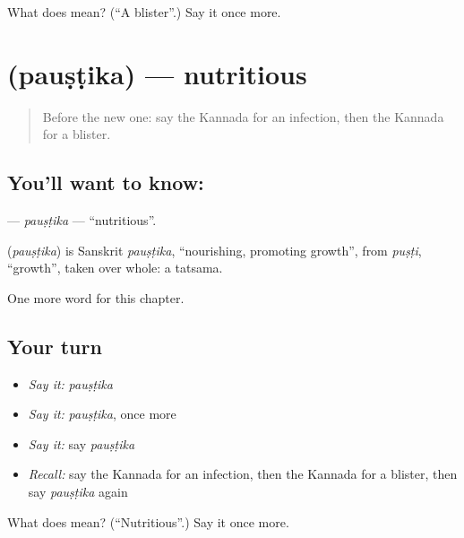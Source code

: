 \begin{tcolorbox}[breakable,colback=teal!4,colframe=teal!35!black,title={Before you move on}]
What does  mean? (\textquotedblleft{}A blister\textquotedblright{}.) Say it once more.
\end{tcolorbox}
\section[\texorpdfstring{\kn{ಪೌಷ್ಟಿಕ} (pauṣṭika)}{ಪೌಷ್ಟಿಕ (pauṣṭika)}]{ (pauṣṭika) — nutritious}

\label{lesson:KA-C170-paustika}



\begin{quote}
Before the new one: say the Kannada for an infection, then the Kannada for a blister.
\end{quote}

\subsection*{You'll want to know: }
\textbf{} — \emph{pauṣṭika} — \textquotedblleft{}nutritious\textquotedblright{}.

\begin{cousinweb}
\textbf{} (\emph{pauṣṭika}) is Sanskrit \emph{pauṣṭika}, \textquotedblleft{}nourishing, promoting growth\textquotedblright{}, from \emph{puṣṭi}, \textquotedblleft{}growth\textquotedblright{}, taken over whole: a tatsama.
\end{cousinweb}

\begin{grammarlens}[title={What you've built}]
One more word for this chapter.
\end{grammarlens}

\subsection*{Your turn}
\begin{itemize}
\raggedright
  \item \emph{Say it:} \emph{pauṣṭika}
  \item \emph{Say it:} \emph{pauṣṭika}, once more
  \item \emph{Say it:} say \emph{pauṣṭika}
  \item \emph{Recall:} say the Kannada for an infection, then the Kannada for a blister, then say \emph{pauṣṭika} again
\end{itemize}

\begin{tcolorbox}[breakable,colback=teal!4,colframe=teal!35!black,title={Before you move on}]
What does  mean? (\textquotedblleft{}Nutritious\textquotedblright{}.) Say it once more.
\end{tcolorbox}
